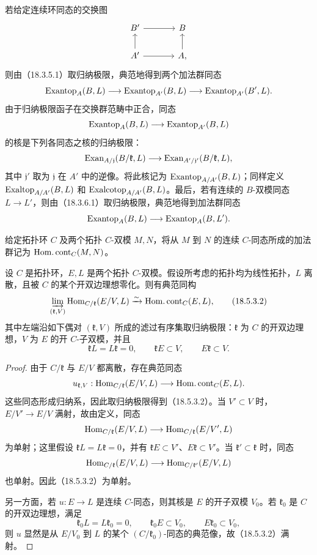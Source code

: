 若给定连续环同态的交换图
\[
\begin{tikzcd}[column sep=large]
B'\arrow[r]&B\\
A'\arrow[r]\arrow[u]&A\arrow[u],
\end{tikzcd}
\]
则由（18.3.5.1）取归纳极限，典范地得到两个加法群同态
\[
 \operatorname{Exantop}_A(B,L)\longrightarrow\operatorname{Exantop}_{A'}(B,L)
 \longrightarrow\operatorname{Exantop}_{A'}(B',L).
\]
由于归纳极限函子在交换群范畴中正合，同态
\[
 \operatorname{Exantop}_A(B,L)\longrightarrow\operatorname{Exantop}_{A'}(B,L)
\]
的核是下列各同态之核的归纳极限：
\[
 \operatorname{Exan}_{A/\mathfrak j}(B/\mathfrak k,L)
 \longrightarrow\operatorname{Exan}_{A'/\mathfrak j'}(B/\mathfrak k,L),
\]
其中 $\mathfrak j'$ 取为 $\mathfrak j$ 在 $A'$ 中的逆像。将此核记为 $\operatorname{Exantop}_{A/A'}(B,L)$；同样定义 $\operatorname{Exaltop}_{A/A'}(B,L)$ 和 $\operatorname{Exalcotop}_{A/A'}(B,L)$。最后，若有连续的 $B$-双模同态 $L\to L'$，则由（18.3.6.1）取归纳极限，典范地得到加法群同态
\[
 \operatorname{Exantop}_A(B,L)\longrightarrow\operatorname{Exantop}_A(B,L').
\]

给定拓扑环 $C$ 及两个拓扑 $C$-双模 $M,N$，将从 $M$ 到 $N$ 的连续 $C$-同态所成的加法群记为 $\operatorname{Hom.cont}_C(M,N)$。

设 $C$ 是拓扑环，$E,L$ 是两个拓扑 $C$-双模。假设所考虑的拓扑均为线性拓扑，$L$ 离散，且被 $C$ 的某个开双边理想零化。则有典范同构
\begin{equation}
 \varinjlim_{(\mathfrak k,V)}\operatorname{Hom}_{C/\mathfrak k}(E/V,L)
 \xrightarrow{\sim}\operatorname{Hom.cont}_C(E,L),
 \tag{18.5.3.2}
\end{equation}
其中左端沿如下偶对 $(\mathfrak k,V)$ 所成的滤过有序集取归纳极限：$\mathfrak k$ 为 $C$ 的开双边理想，$V$ 为 $E$ 的开 $C$-子双模，并且
\[
 \mathfrak kL=L\mathfrak k=0,\qquad
 \mathfrak kE\subset V,\qquad E\mathfrak k\subset V.
\]
\begin{proof}
由于 $C/\mathfrak k$ 与 $E/V$ 都离散，存在典范同态
\[
 u_{\mathfrak k,V}:\operatorname{Hom}_{C/\mathfrak k}(E/V,L)
 \longrightarrow\operatorname{Hom.cont}_C(E,L).
\]
这些同态形成归纳系，因此取归纳极限得到（18.5.3.2）。当 $V'\subset V$ 时，$E/V'\to E/V$ 满射，故由定义，同态
\[
 \operatorname{Hom}_{C/\mathfrak k}(E/V,L)\longrightarrow
 \operatorname{Hom}_{C/\mathfrak k}(E/V',L)
\]
为单射；这里假设 $\mathfrak kL=L\mathfrak k=0$，并有 $\mathfrak kE\subset V'$、$E\mathfrak k\subset V'$。当 $\mathfrak k'\subset\mathfrak k$ 时，同态
\[
 \operatorname{Hom}_{C/\mathfrak k}(E/V,L)\longrightarrow
 \operatorname{Hom}_{C/\mathfrak k'}(E/V,L)
\]
也单射。因此（18.5.3.2）为单射。

另一方面，若 $u:E\to L$ 是连续 $C$-同态，则其核是 $E$ 的开子双模 $V_0$。若 $\mathfrak k_0$ 是 $C$ 的开双边理想，满足
\[
 \mathfrak k_0L=L\mathfrak k_0=0,\qquad
 \mathfrak k_0E\subset V_0,\qquad E\mathfrak k_0\subset V_0,
\]
则 $u$ 显然是从 $E/V_0$ 到 $L$ 的某个 $(C/\mathfrak k_0)$-同态的典范像，故（18.5.3.2）满射。
\end{proof}

